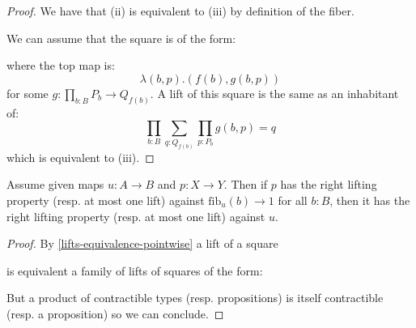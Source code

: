 \begin{proof}
We have that (ii) is equivalent to (iii) by definition of the fiber.

We can assume that the square is of the form:
 \begin{center}
  \end{center}
  where the top map is:
  \[
  \lambda (b,p). (f(b),g(b,p))
  \]
  for some $g:\prod_{b:B} P_b \to Q_{f(b)}$. A lift of this square is the same as an inhabitant of:
  \[
  \prod_{b:B} \sum_{q:Q_{f(b)}} \prod_{p:P_b} g(b,p)=q
  \]
  which is equivalent to (iii).
\end{proof}

\begin{lemma}
\label{pointwise-lift-is-enough}
Assume given maps $u:A\to B$ and $p:X\to Y$.
Then if $p$ has the right lifting property (resp. at most one lift) against $\mathrm{fib}_u(b)\to 1$ for all $b:B$, then it has the right lifting property (resp. at most one lift) against $u$.
\end{lemma}

\begin{proof}
By \cref{lifts-equivalence-pointwise} a lift of a square
 \begin{center}
  \end{center}
  is equivalent a family of lifts of squares of the form: 
   \begin{center}
  \end{center}
  But a product of contractible types (resp. propositions) is itself contractible (resp. a proposition) so we can conclude. 
\end{proof}

